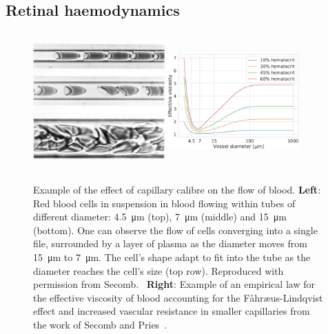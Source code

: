 \documentclass{article}
\begin{document}
\subsection*{Retinal haemodynamics}

\begin{figure}[t!]
  \centering
  \includegraphics[width=0.45\textwidth, height=5.3cm]{cropped-RBC-in-capillaries.jpg}
  \hfill
  \includegraphics[width=0.45\textwidth, height=5.3cm]{EffectiveViscosity-Secomb.jpeg}
  \caption{Example of the effect of capillary calibre on the flow of blood. \textbf{Left}: Red blood cells in suspension in blood flowing within tubes of different diameter: \SI{4.5}{\micro\meter} (top), \SI{7}{\micro\meter} (middle) and \SI{15}{\micro\meter} (bottom). One can observe the flow of cells converging into a single file, surrounded by a layer of plasma as the diameter moves from \SI{15}{\micro\meter} to \SI{7}{\micro\meter}. The cell's shape adapt to fit into the tube as the diameter reaches the cell's size (top row). Reproduced with permission from Secomb.~\cite{Secomb_2003} \textbf{Right}: Example of an empirical law for the effective viscosity of blood accounting for the F\r{a}hr\ae us-Lindqvist effect and increased vascular resistance in smaller capillaries from the work of Secomb and Pries~\cite{Secomb_2013}.}
  \label{fig:effectiveViscosity}
\end{figure}
\end{document}
